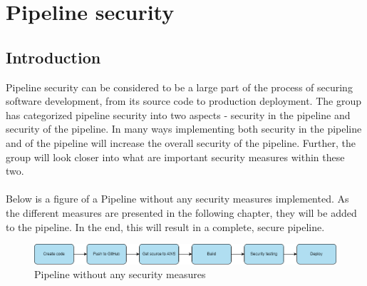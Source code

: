 \chapter{Pipeline security}
\section{Introduction}
Pipeline security can be considered to be a large part of the process of securing software development, from its source code to production deployment. The group has categorized pipeline security into two aspects - security in the pipeline and security of the pipeline. In many ways implementing both security in the pipeline and of the pipeline will increase the overall security of the pipeline. Further, the group will look closer into what are important security measures within these two. 
\\~\\
Below is a figure of a \gls{Pipeline} without any security measures implemented. As the different measures are presented in the following chapter, they will be added to the pipeline. In the end, this will result in a complete, secure pipeline.

\vspace{2mm}
\begin{figure}[H]
    \centering
    \includegraphics[width=0.8\columnwidth]{Images/SecurePipeline-Page-3.drawio.png}
    \caption{Pipeline without any security measures}
    \label{fig: Pipeline without any security measures}
\end{figure}




